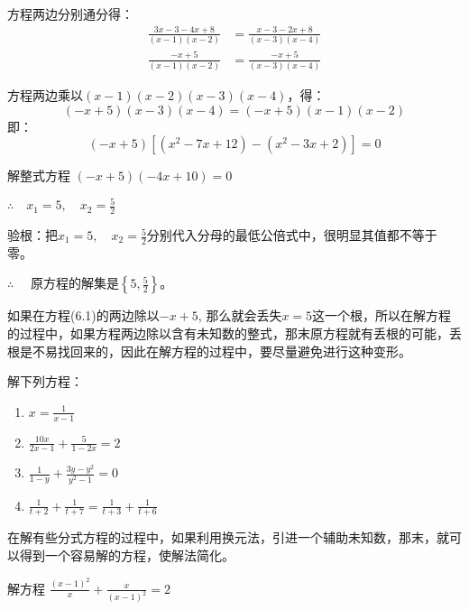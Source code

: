 \begin{solution}
    方程两边分别通分得：
\[\begin{split}
    \frac{3x-3-4x+8}{(x-1)(x-2)}&=\frac{x-3-2x+8}{(x-3)(x-4)}\\
    \frac{-x+5}{(x-1)(x-2)}&=\frac{-x+5}{(x-3)(x-4)}
\end{split}\]

方程两边乘以$(x-1)(x-2)(x-3)(x-4)$，得：
\begin{equation}
    (-x+5)(x-3)(x-4)=(-x+5)(x-1)(x-2)
\end{equation}
即：
\[(-x+5)[(x^2-7x+12)-(x^2-3x+2)]=0\]

解整式方程 $(-x+5)(-4x+10)=0$

$\therefore\quad x_1=5,\quad x_2=\frac{5}{2}$

验根：把$x_1=5,\quad x_2=\frac{5}{2}$分别代入分母的最低公倍式中，很明显其值都不等于零。

$\therefore\quad $ 原方程的解集是$\left\{5,\frac{5}{2}\right\}$。
\end{solution}

\begin{rmk}
  如果在方程(6.1)的两边除以$-x+5$, 那么就会丢失$x=5$这一个根，所以在解方程的过程中，如果方程两边除以含有未知数的整式，那末原方程就有丢根的可能，丢根是不易找回来的，因此在解方程的过程中，要尽量避免进行这种变形。    
\end{rmk}

\begin{ex}
解下列方程：
\begin{multicols}{2}
    \begin{enumerate}
        \item $x=\frac{1}{x-1}$
        \item $\frac{10x}{2x-1}+\frac{5}{1-2x}=2$
        \item $\frac{1}{1-y}+\frac{3y-y^2}{y^2-1}=0$
        \item $\frac{1}{t+2}+\frac{1}{t+7}=\frac{1}{t+3}+\frac{1}{t+6}$
    \end{enumerate}
\end{multicols}
\end{ex}

在解有些分式方程的过程中，如果利用换元法，引进一个辅助未知数，那末，就可以得到一个容易解的方程，使解法简化。


\begin{example}
解方程 $\frac{(x-1)^2}{x}+\frac{x}{(x-1)^2}=2$
\end{example}

